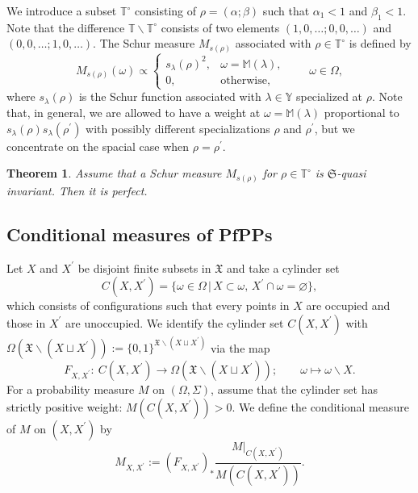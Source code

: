 \documentclass[pdftex]{sigma}
\numberwithin{equation}{section}
\newtheorem{Theorem}{Theorem}[section]
\newcommand{\pr}[1]{#1^{\prime}}
\newcommand{\mfrak}[1]{\mathfrak{#1}}
\newcommand{\mbb}[1]{\mathbb{#1}}
\newcommand{\mrm}[1]{\mathrm{#1}}
\begin{document}
We introduce a subset $\mbb{T}^{\circ}$ consisting of $\rho=(\alpha;\beta)$ such that $\alpha_{1}<1$ and $\beta_{1}<1$.
Note that the difference $\mbb{T}\backslash\mbb{T}^{\circ}$ consists of two elements $(1,0,\dots; 0,0,\dots)$ and $(0,0,\dots; 1,0,\dots)$. The Schur measure $M_{s(\rho)}$ associated with $\rho\in\mbb{T}^{\circ}$ is defined by
\begin{equation*}
	M_{s(\rho)}(\omega)\propto\begin{cases}
		s_{\lambda}(\rho)^{2}, & \omega=\mbb{M}(\lambda),\\
		0, & \mrm{otherwise},
	\end{cases}\qquad \omega\in \Omega,
\end{equation*}
where $s_{\lambda}(\rho)$ is the Schur function associated with $\lambda\in\mbb{Y}$ specialized at $\rho$. Note that, in general, we are allowed to have a weight at $\omega=\mbb{M}(\lambda)$ proportional to $s_{\lambda}(\rho)s_{\lambda}(\pr{\rho})$ with possibly different specializations $\rho$ and $\pr{\rho}$, but we concentrate on the spacial case when $\rho=\pr{\rho}$.

\begin{Theorem}\label{thm:perfectness_Schur}
Assume that a Schur measure $M_{s(\rho)}$ for $\rho\in\mbb{T}^{\circ}$ is $\mfrak{S}$-quasi invariant. Then it is perfect.
\end{Theorem}

\subsection{Conditional measures of PfPPs}
Let $X$ and $\pr{X}$ be disjoint finite subsets in $\mfrak{X}$ and take a cylinder set
\begin{equation*}
	C(X,\pr{X})=\{\omega\in \Omega\,|\, X\subset \omega,\, \pr{X}\cap\omega=\varnothing\},
\end{equation*}
which consists of configurations such that every points in $X$ are occupied and those in $\pr{X}$ are unoccupied.
We identify the cylinder set $C(X,\pr{X})$ with $\Omega (\mfrak{X}\backslash (X\sqcup\pr{X})):=\{0,1\}^{\mfrak{X}\backslash (X\sqcup\pr{X})}$ via the map
\begin{equation*}
	F_{X,\pr{X}}\colon \ C(X,\pr{X})\to \Omega (\mfrak{X}\backslash (X\sqcup\pr{X}));\qquad \omega\mapsto \omega\backslash X.
\end{equation*}
For a probability measure $M$ on $(\Omega,\Sigma)$, assume that the cylinder set has strictly positive weight: $M(C(X,\pr{X}))>0$.
We define the conditional measure of $M$ on $(X,\pr{X})$ by
\begin{equation*}
	M_{X,\pr{X}}:=(F_{X,\pr{X}})_{\ast}\frac{M\big|_{C(X,\pr{X})}}{M(C(X,\pr{X}))}.
\end{equation*}
\end{document}
